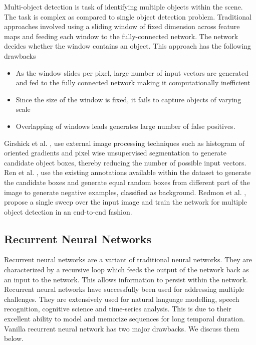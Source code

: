 \documentclass[sigconf]{acmart}
\begin{document}
Multi-object detection is task of identifying multiple objects within the scene. The task is complex as compared to single object detection problem. Traditional approaches involved using a sliding window of fixed dimension across feature maps and feeding each window to the fully-connected network. The network decides whether the window contains an object. This approach has the following drawbacks

\begin{itemize}
\setlength\itemsep{1em}
\item As the window slides per pixel, large number of input vectors are generated and fed to the fully connected network making it computationally inefficient

\item Since the size of the window is fixed, it fails to capture objects of varying scale

\item Overlapping of windows leads generates large number of false positives.

\end{itemize}

Girshick et al. \cite{DBLP:journals/corr/GirshickDDM13}, use external image processing techniques such as histogram of oriented gradients and pixel wise unsupervised segmentation to generate candidate object boxes, thereby reducing the number of possible input vectors. Ren et al. \cite{DBLP:journals/corr/RenHG015}, use the existing annotations available within the dataset to generate the candidate boxes and generate equal random boxes from different part of the image to generate negative examples, classified as background. Redmon et al. \cite{DBLP:journals/corr/RedmonDGF15}, propose a single sweep over the input image and train the network for multiple object detection in an end-to-end fashion. 

\subsection{Recurrent Neural Networks} \label{RNN}

Recurrent neural networks \cite{DBLP:journals/corr/Lipton15} are a variant of traditional neural networks. They are characterized by a recursive loop which feeds the output of the network back as an input to the network. This allows information to persist within the network. Recurrent neural networks have successfully been used for addressing multiple challenges. They are extensively used for natural language modelling, speech recognition, cognitive science and time-series analysis. This is due to their excellent ability to model and memorize sequences for long temporal duration. Vanilla recurrent neural network has two major drawbacks. We discuss them below.
\end{document}
